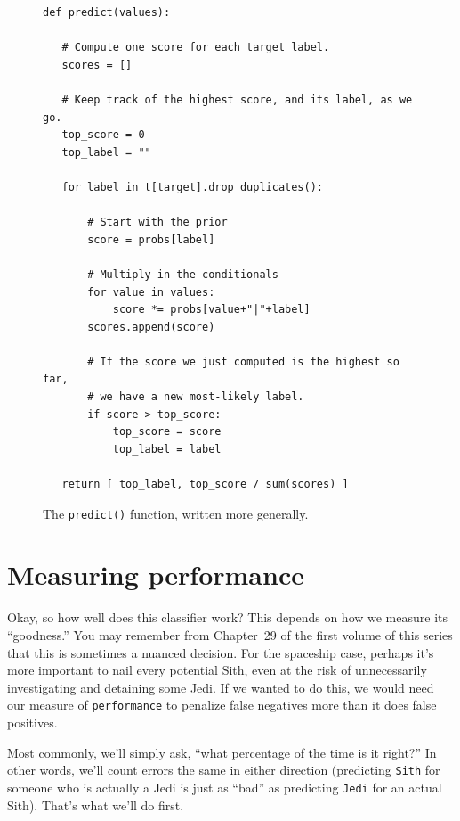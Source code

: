 \begin{figure}[ht]
\centering
\begin{Verbatim}[fontsize=\footnotesize,samepage=true,frame=single,framesep=3mm]
def predict(values):

   # Compute one score for each target label.
   scores = []

   # Keep track of the highest score, and its label, as we go.
   top_score = 0
   top_label = ""

   for label in t[target].drop_duplicates():

       # Start with the prior
       score = probs[label]

       # Multiply in the conditionals
       for value in values:
           score *= probs[value+"|"+label]
       scores.append(score)

       # If the score we just computed is the highest so far,
       # we have a new most-likely label.
       if score > top_score:
           top_score = score
           top_label = label

   return [ top_label, top_score / sum(scores) ]
\end{Verbatim}
\caption{The \texttt{predict()} function, written more generally.}
\label{fig:generalPredict}
\end{figure}


\section{Measuring performance}


Okay, so how well does this classifier work? This depends on how we measure its
``goodness.'' You may remember from Chapter~29 of the first volume of this
series that this is sometimes a nuanced decision. For the spaceship case,
perhaps it's more important to nail every potential Sith, even at the risk of
unnecessarily investigating and detaining some Jedi. If we wanted to do this,
we would need our measure of \texttt{performance} to penalize false negatives
more than it does false positives.

Most commonly, we'll simply ask, ``what percentage of the time is it right?''
In other words, we'll count errors the same in either direction (predicting
\texttt{Sith} for someone who is actually a Jedi is just as ``bad'' as
predicting \texttt{Jedi} for an actual Sith). That's what we'll do first.


